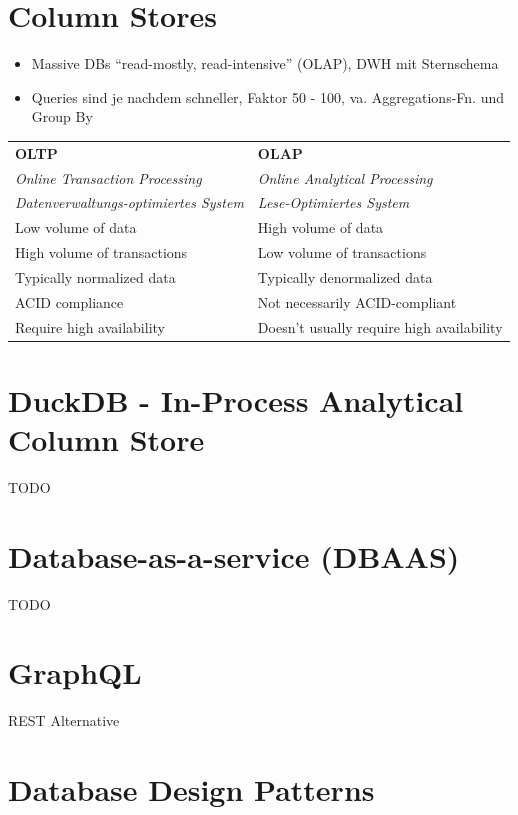 \documentclass[a4paper, landscape, 8pt]{scrartcl}
\begin{document}
\begin{multicols*}{4}
        \section{Column Stores}
        \begin{itemize}
            \item Massive DBs \enquote{read-mostly, read-intensive} (OLAP), DWH mit Sternschema
            \item Queries sind je nachdem schneller, Faktor 50 - 100, va. Aggregations-Fn. und Group By
        \end{itemize}
        \begin{tabularx}{\columnwidth}{X | X}
            \textbf{OLTP} & \textbf{OLAP} \\
            \textit{Online Transaction Processing} & \textit{Online Analytical Processing} \\
            \textit{Datenverwaltungs-optimiertes System} & \textit{Lese-Optimiertes System} \\
            \hline
            Low volume of data & High volume of data \\
            \hline
            High volume of transactions & Low volume of transactions \\
            \hline
            Typically normalized data & Typically denormalized data \\
            \hline
            ACID compliance & Not necessarily ACID-compliant \\
            \hline
            Require high availability & Doesn't usually require high availability
        \end{tabularx}

        \section{DuckDB - In-Process Analytical Column Store}
        TODO

        \section{Database-as-a-service (DBAAS)}
        TODO

        \section{GraphQL}
        REST Alternative



        \section{Database Design Patterns}

\end{multicols*}
\end{document}
